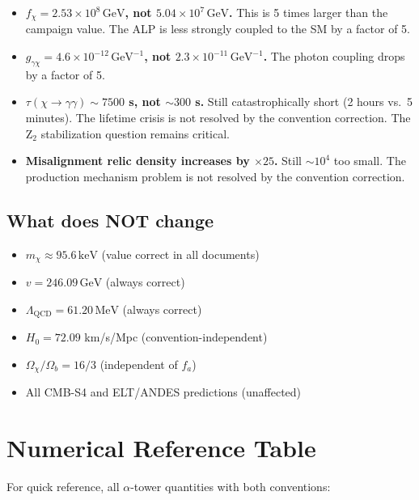 \documentclass[11pt]{article}
\newcommand{\GeV}{\,\mathrm{GeV}}
\newcommand{\MeV}{\,\mathrm{MeV}}
\newcommand{\keV}{\,\mathrm{keV}}
\begin{document}
\begin{itemize}
\item \textbf{$f_\chi = 2.53 \times 10^8\GeV$, not $5.04 \times 10^7\GeV$.}
  This is 5 times larger than the campaign value. The ALP is less strongly
  coupled to the SM by a factor of 5.

\item \textbf{$g_{\gamma\chi} = 4.6 \times 10^{-12}\,\mathrm{GeV}^{-1}$,
  not $2.3 \times 10^{-11}\,\mathrm{GeV}^{-1}$.}
  The photon coupling drops by a factor of 5.

\item \textbf{$\tau(\chi\to\gamma\gamma) \sim 7500$ s, not $\sim 300$ s.}
  Still catastrophically short (2 hours vs.\ 5 minutes). The lifetime crisis
  is not resolved by the convention correction. The Z$_2$ stabilization
  question remains critical.

\item \textbf{Misalignment relic density increases by $\times 25$.}
  Still $\sim 10^4$ too small. The production mechanism problem is not
  resolved by the convention correction.
\end{itemize}

\subsection{What does NOT change}

\begin{itemize}
\item $m_\chi \approx 95.6\keV$ (value correct in all documents)
\item $v = 246.09\GeV$ (always correct)
\item $\Lambda_\mathrm{QCD} = 61.20\MeV$ (always correct)
\item $H_0 = 72.09$ km/s/Mpc (convention-independent)
\item $\Omega_\chi/\Omega_b = 16/3$ (independent of $f_a$)
\item All CMB-S4 and ELT/ANDES predictions (unaffected)
\end{itemize}

\section{Numerical Reference Table}

For quick reference, all $\alpha$-tower quantities with both conventions:
\end{document}
